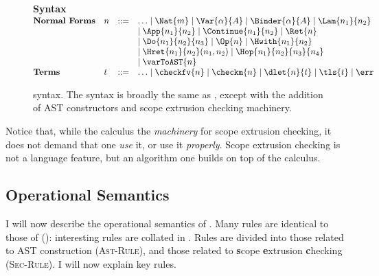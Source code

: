 \begin{figure}
\begin{core-desc}
  {\large \textbf{Syntax}} \\

  $\begin{array}{@{}llll}
    \textbf{Normal Forms} & n & ::= & \ldots \mid \Nat{m} \mid \Var{\alpha}{A} \mid \Binder{\alpha}{A} \mid \Lam{n_1}{n_2}  \\ 
  &&&\mid \App{n_1}{n_2} \mid \Continue{n_1}{n_2} \mid \Ret{n}   \\ 
  &&& \mid \Do{n_1}{n_2}{n_3} \mid \Op{n} \mid \Hwith{n_1}{n_2}   \\
  &&&\mid \Hret{n_1}{n_2}(n_1, n_2) \mid \Hop{n_1}{n_2}{n_3}{n_4} \\
  &&& \mid \varToAST{n} \\
  \textbf{Terms} & t & ::= & \ldots \mid \checkfv{n} \mid \checkm{n} \mid \dlet{n}{t} \mid \tls{t} \mid \err
  \end{array}$
\end{core-desc}
\caption{\coreLang{} syntax. The syntax is broadly the same as \efflang{}, except with the addition of AST constructors and scope extrusion checking machinery.}
\label{fig:source-syntax}
\end{figure}

Notice that, while the calculus the \textit{machinery} for scope extrusion checking, it does not demand that one \textit{use} it, or use it \textit{properly}. Scope extrusion checking is not a language feature, but an algorithm one builds on top of the calculus. 
\subsection{Operational Semantics}
I will now describe the operational semantics of \coreLang{}. Many rules are identical to those of \efflang{} (): interesting rules are collated in . Rules are divided into those related to AST construction (\textsc{Ast-Rule}), and those related to \textbf{s}cope \textbf{e}xtrusion \textbf{c}hecking (\textsc{Sec-Rule}). I will now explain key rules. 

\newcommand{\coreConfiguration}[5]{{#1}; {#2}; {#3}; {#4}; {#5}}
  \newcommand{\astRule}[1]{\rulename{Ast}{#1}}
  \newcommand{\secRule}[1]{\rulename{Sec}{#1}}

